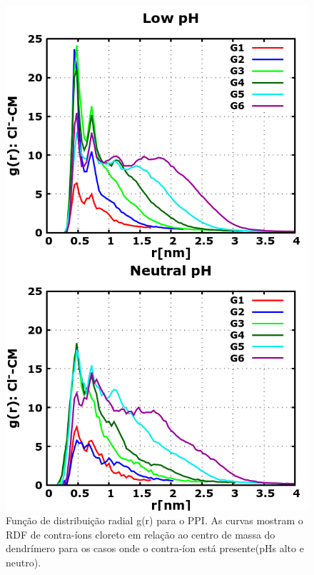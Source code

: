 \begin{figure}[ht!]
\centering
\includegraphics[scale=0.3]{images/PME/PPIClRDF.png}
\caption{Função de distribuição radial g(r) para o PPI. As curvas mostram o RDF de contra-íons cloreto em relação ao centro de massa do dendrímero para os casos onde o contra-íon está presente(pHs alto e neutro).}
\label{supfig:PPIClRDF}
\end{figure}